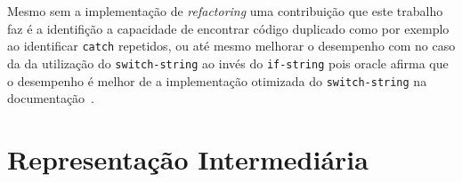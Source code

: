 Mesmo sem a implementa\c{c}\~{a}o de \textit{refactoring} uma contribui\c{c}\~{a}o que este trabalho faz \'{e} a identifi\c{c}\~{a}o a capacidade de encontrar c\'{o}digo duplicado como por exemplo ao identificar \texttt{catch} repetidos, ou at\'{e} mesmo melhorar o desempenho com no caso da da utilizaç\~{a}o do \texttt{switch-string} ao inv\'{e}s do \texttt{if-string} pois oracle afirma que o desempenho \'{e} melhor de a implementa\c{c}\~{a}o otimizada do \texttt{switch-string} na documenta\c{c}\~{a}o~\cite{docSwitch}.





 

\section{Representa\c{c}\~{a}o Intermedi\'{a}ria}\label{sec:IR}

